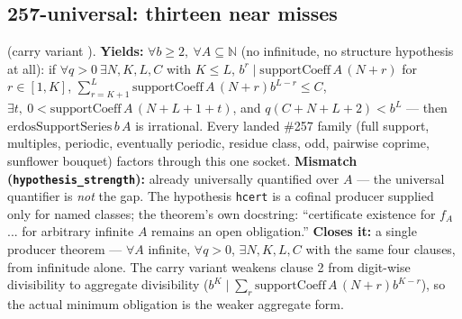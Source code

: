 \subsection{257-universal: thirteen near misses}

\begin{obs} 
(carry variant ).
\textbf{Yields:} $\forall b\ge2,\ \forall A\subseteq\mathbb N$ (no infinitude, no structure
hypothesis at all): if $\forall q>0\ \exists N,K,L,C$ with $K\le L$, $b^r \mid
\mathrm{supportCoeff}\,A\,(N{+}r)$ for $r\in[1,K]$, $\sum_{r=K+1}^L \mathrm{supportCoeff}\,A\,(N{+}r)
b^{L-r}\le C$, $\exists t,\ 0<\mathrm{supportCoeff}\,A\,(N{+}L{+}1{+}t)$, and $q(C{+}N{+}L{+}2)<b^L$
— then $\mathrm{erdosSupportSeries}\,b\,A$ is irrational. Every landed \#257 family (full
support, multiples, periodic, eventually periodic, residue class, odd, pairwise coprime,
sunflower bouquet) factors through this one socket.
\textbf{Mismatch (\texttt{hypothesis\_strength}):} already universally quantified over $A$ — the
universal quantifier is \emph{not} the gap. The hypothesis \texttt{hcert} is a cofinal producer
supplied only for named classes; the theorem's own docstring: ``certificate existence for
$f_A$... for arbitrary infinite $A$ remains an open obligation.''
\textbf{Closes it:} a single producer theorem — $\forall A$ infinite, $\forall q>0$, $\exists
N,K,L,C$ with the same four clauses, from infinitude alone. The carry variant weakens clause 2
from digit-wise divisibility to aggregate divisibility ($b^K \mid \sum_r
\mathrm{supportCoeff}\,A\,(N{+}r)b^{K-r}$), so the actual minimum obligation is the weaker
aggregate form.
\end{obs}

